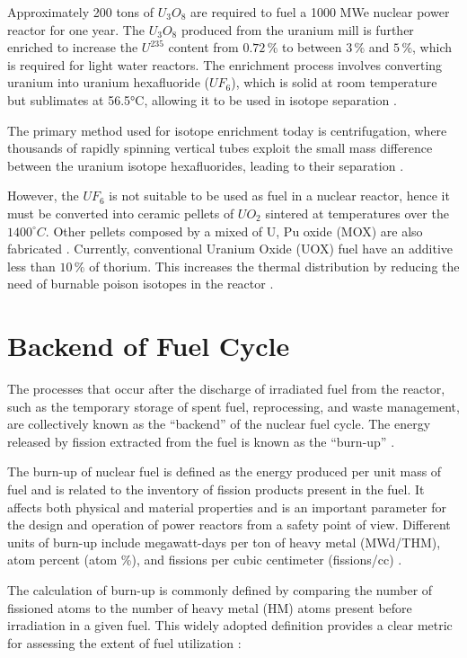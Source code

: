 Approximately 200 tons of \(U_3O_8\) are required to fuel a 1000 MWe nuclear power reactor for one year. The \(U_3O_8\) produced from the uranium mill is further enriched to increase the \(U^{235}\) content from \(0.72 \, \%\) to between \(3 \, \%\) and \(5 \, \%\), which is required for light water reactors. The enrichment process involves converting uranium into uranium hexafluoride (\(UF_6\)), which is solid at room temperature but sublimates at 56.5°C, allowing it to be used in isotope separation \cite{fuel_cycle_book}.

The primary method used for isotope enrichment today is centrifugation, where thousands of rapidly spinning vertical tubes exploit the small mass difference between the uranium isotope hexafluorides, leading to their separation \cite{fuel_cycle_book}.

However, the \(UF_6\) is not suitable to be used as fuel in a nuclear reactor, hence it must be converted into ceramic pellets of \(UO_2\) sintered at temperatures over the \(1400^{\circ}C\). Other pellets composed by a mixed of U, Pu oxide (MOX) are also fabricated \cite{fuel_cycle_book}. Currently, conventional Uranium Oxide (UOX) fuel have an additive less than \(10 \, \%\) of thorium. This increases the thermal distribution by reducing the need of burnable poison isotopes in the reactor \cite{Th_cycle_viability}.

\section{Backend of Fuel Cycle}

The processes that occur after the discharge of irradiated fuel from the reactor, such as the temporary storage of spent fuel, reprocessing, and waste management, are collectively known as the ``backend'' of the nuclear fuel cycle. The energy released by fission extracted from the fuel is known as the ``burn-up'' \cite{fuel_cycle_book}.

The burn-up of nuclear fuel is defined as the energy produced per unit mass of fuel and is related to the inventory of fission products present in the fuel. It affects both physical and material properties and is an important parameter for the design and operation of power reactors from a safety point of view. Different units of burn-up include megawatt-days per ton of heavy metal (MWd/THM), atom percent (atom \%), and fissions per cubic centimeter (fissions/cc) \cite{fuel_cycle_book}.

The calculation of burn-up is commonly defined by comparing the number of fissioned atoms to the number of heavy metal (HM) atoms present before irradiation in a given fuel. This widely adopted definition provides a clear metric for assessing the extent of fuel utilization \cite{fuel_cycle_book}:

